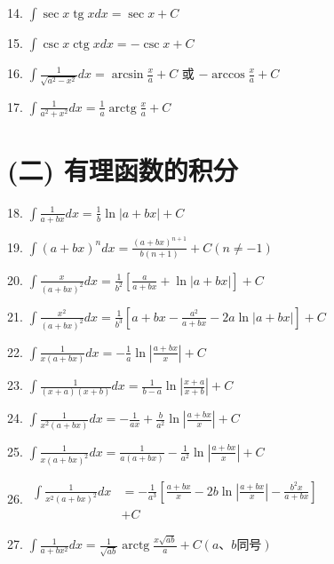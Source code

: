 \documentclass[lang=cn,newtx,10pt,scheme=chinese]{elegantbook}
\begin{document}
14. \(\int \sec x\operatorname{tg}{xdx} = \sec x + C\)

15. \(\int \csc x\operatorname{ctg}{xdx} = - \csc x + C\)

16. \(\int \frac{1}{\sqrt{{a}^{2} - {x}^{2}}}{dx} = \arcsin \frac{x}{a} + C\) 或 \(- \arccos \frac{x}{a} + C\)

17. \(\int \frac{1}{{a}^{2} + {x}^{2}}{dx} = \frac{1}{a}\operatorname{arctg}\frac{x}{a} + C\)

\section*{(二) 有理函数的积分}

18. \(\int \frac{1}{a + {bx}}{dx} = \frac{1}{b}\ln \left| {a + {bx}}\right| + C\)

19. \(\int {\left( a + bx\right) }^{n}{dx} = \frac{{\left( a + bx\right) }^{n + 1}}{b\left( {n + 1}\right) } + C\left( {n \neq - 1}\right)\)

20. \(\int \frac{x}{{\left( a + bx\right) }^{2}}{dx} = \frac{1}{{b}^{2}}\left\lbrack {\frac{a}{a + {bx}} + \ln \left| {a + {bx}}\right| }\right\rbrack + C\)

21. \(\int \frac{{x}^{2}}{{\left( a + bx\right) }^{2}}{dx} = \frac{1}{{b}^{3}}\left\lbrack {a + {bx} - \frac{{a}^{2}}{a + {bx}} - {2a}\ln \left| {a + {bx}}\right| }\right\rbrack + C\)

22. \(\int \frac{1}{x\left( {a + {bx}}\right) }{dx} = - \frac{1}{a}\ln \left| \frac{a + {bx}}{x}\right| + C\)

23. \(\int \frac{1}{\left( {x + a}\right) \left( {x + b}\right) }{dx} = \frac{1}{b - a}\ln \left| \frac{x + a}{x + b}\right| + C\)

24. \(\int \frac{1}{{x}^{2}\left( {a + {bx}}\right) }{dx} = - \frac{1}{ax} + \frac{b}{{a}^{2}}\ln \left| \frac{a + {bx}}{x}\right| + C\)

25. \(\int \frac{1}{x{\left( a + bx\right) }^{2}}{dx} = \frac{1}{a\left( {a + {bx}}\right) } - \frac{1}{{a}^{2}}\ln \left| \frac{a + {bx}}{x}\right| + C\)

26. \(\begin{aligned} \int \frac{1}{{x}^{2}{\left( a + bx\right) }^{2}}{dx} & = - \frac{1}{{a}^{3}}\left\lbrack {\frac{a + {bx}}{x} - {2b}\ln \left| \frac{a + {bx}}{x}\right| - \frac{{b}^{2}x}{a + {bx}}}\right\rbrack \\ & + C \end{aligned}\)

27. \(\int \frac{1}{a + b{x}^{2}}{dx} = \frac{1}{\sqrt{ab}}\operatorname{arctg}\frac{x\sqrt{ab}}{a} + C\left( {a\text{、}b\text{同号}}\right)\)
\end{document}
